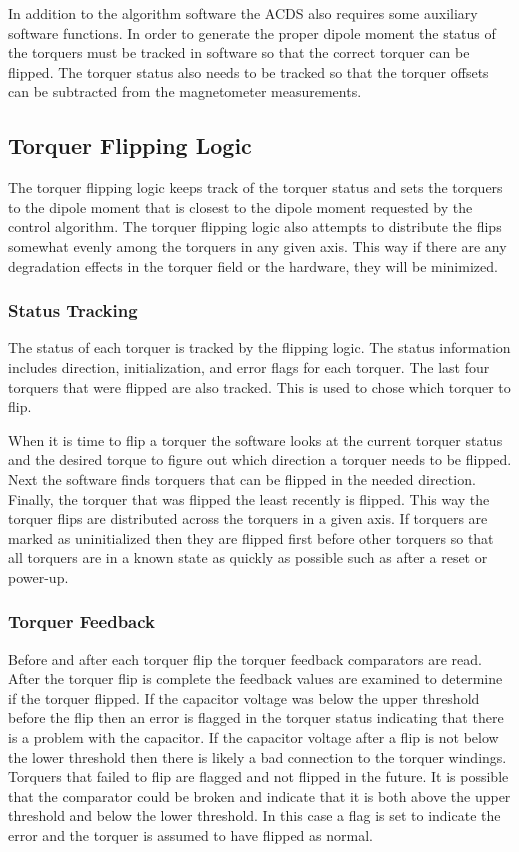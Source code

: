 In addition to the algorithm software the \ac{ACDS} also requires some auxiliary software functions. In order to generate the proper dipole moment the status of the torquers must be tracked in software so that the correct torquer can be flipped. The torquer status also needs to be tracked so that the torquer offsets can be subtracted from the magnetometer measurements. 

\subsection{Torquer Flipping Logic}

The torquer flipping logic keeps track of the torquer status and sets the torquers to the dipole moment that is closest to the dipole moment requested by the control algorithm. The torquer flipping logic also attempts to distribute the flips somewhat evenly among the torquers in any given axis. This way if there are any degradation effects in the torquer field or the hardware, they will be minimized. 

\subsubsection{Status Tracking}

The status of each torquer is tracked by the flipping logic. The status information includes direction, initialization, and error flags for each torquer. The last four torquers that were flipped are also tracked. This is used to chose which torquer to flip.

When it is time to flip a torquer the software looks at the current torquer status and the desired torque to figure out which direction a torquer needs to be flipped. Next the software finds torquers that can be flipped in the needed direction. Finally, the torquer that was flipped the least recently is flipped. This way the torquer flips are distributed across the torquers in a given axis. If torquers are marked as uninitialized then they are flipped first before other torquers so that all torquers are in a known state as quickly as possible such as after a reset or power-up.

\subsubsection{Torquer Feedback}

Before and after each torquer flip the torquer feedback comparators are read. After the torquer flip is complete the feedback values are examined to determine if the torquer flipped. If the capacitor voltage was below the upper threshold before the flip then an error is flagged in the torquer status indicating that there is a problem with the capacitor. If the capacitor voltage after a flip is not below the lower threshold then there is likely a bad connection to the torquer windings. Torquers that failed to flip are flagged and not flipped in the future. It is possible that the comparator could be broken and indicate that it is both above the upper threshold and below the lower threshold. In this case a flag is set to indicate the error and the torquer is assumed to have flipped as normal.

